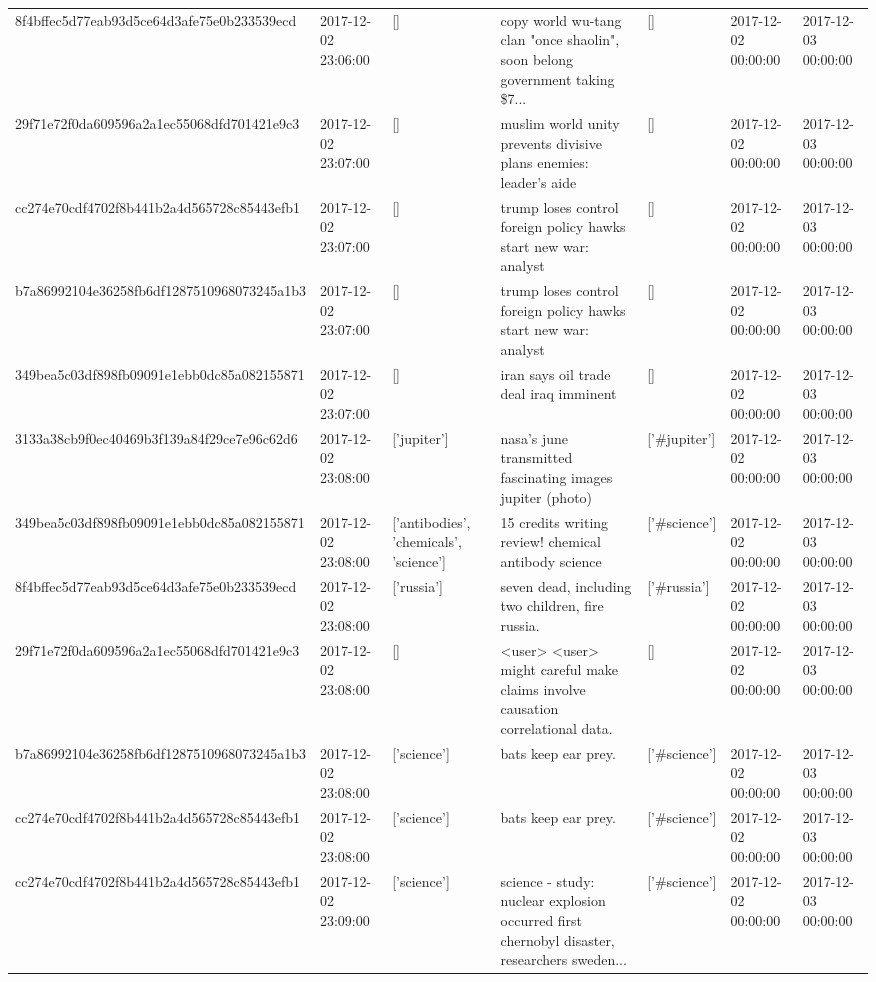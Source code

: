 \begin{tabular}{lllllll}
8f4bffec5d77eab93d5ce64d3afe75e0b233539ecd & 2017-12-02 23:06:00 & [] & copy world wu-tang clan "once shaolin", soon belong government taking \$7... & [] & 2017-12-02 00:00:00 & 2017-12-03 00:00:00 \\
29f71e72f0da609596a2a1ec55068dfd701421e9c3 & 2017-12-02 23:07:00 & [] & muslim world unity prevents divisive plans enemies: leader's aide & [] & 2017-12-02 00:00:00 & 2017-12-03 00:00:00 \\
cc274e70cdf4702f8b441b2a4d565728c85443efb1 & 2017-12-02 23:07:00 & [] & trump loses control foreign policy hawks start new war: analyst & [] & 2017-12-02 00:00:00 & 2017-12-03 00:00:00 \\
b7a86992104e36258fb6df1287510968073245a1b3 & 2017-12-02 23:07:00 & [] & trump loses control foreign policy hawks start new war: analyst & [] & 2017-12-02 00:00:00 & 2017-12-03 00:00:00 \\
349bea5c03df898fb09091e1ebb0dc85a082155871 & 2017-12-02 23:07:00 & [] & iran says oil trade deal iraq imminent & [] & 2017-12-02 00:00:00 & 2017-12-03 00:00:00 \\
3133a38cb9f0ec40469b3f139a84f29ce7e96c62d6 & 2017-12-02 23:08:00 & ['jupiter'] & nasa's june transmitted fascinating images jupiter (photo) & ['#jupiter'] & 2017-12-02 00:00:00 & 2017-12-03 00:00:00 \\
349bea5c03df898fb09091e1ebb0dc85a082155871 & 2017-12-02 23:08:00 & ['antibodies', 'chemicals', 'science'] & 15 credits writing review! chemical antibody science & ['#science'] & 2017-12-02 00:00:00 & 2017-12-03 00:00:00 \\
8f4bffec5d77eab93d5ce64d3afe75e0b233539ecd & 2017-12-02 23:08:00 & ['russia'] & seven dead, including two children, fire russia. & ['#russia'] & 2017-12-02 00:00:00 & 2017-12-03 00:00:00 \\
29f71e72f0da609596a2a1ec55068dfd701421e9c3 & 2017-12-02 23:08:00 & [] & <user> <user> might careful make claims involve causation correlational data. & [] & 2017-12-02 00:00:00 & 2017-12-03 00:00:00 \\
b7a86992104e36258fb6df1287510968073245a1b3 & 2017-12-02 23:08:00 & ['science'] & bats keep ear prey. & ['#science'] & 2017-12-02 00:00:00 & 2017-12-03 00:00:00 \\
cc274e70cdf4702f8b441b2a4d565728c85443efb1 & 2017-12-02 23:08:00 & ['science'] & bats keep ear prey. & ['#science'] & 2017-12-02 00:00:00 & 2017-12-03 00:00:00 \\
cc274e70cdf4702f8b441b2a4d565728c85443efb1 & 2017-12-02 23:09:00 & ['science'] & science - study: nuclear explosion occurred first chernobyl disaster, researchers sweden... & ['#science'] & 2017-12-02 00:00:00 & 2017-12-03 00:00:00 \\

\end{tabular}
